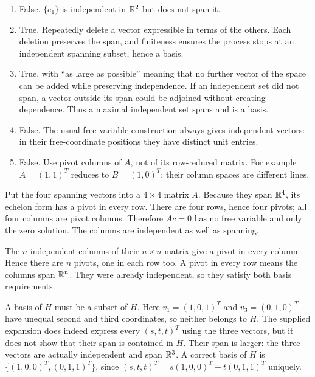 \begin{enumerate}[label=(\alph*)]
\item False. $\{e_1\}$ is independent in $\mathbb{R}^2$ but does not span it.
\item True. Repeatedly delete a vector expressible in terms of the
others. Each deletion preserves the span, and finiteness ensures the
process stops at an independent spanning subset, hence a basis.
\item True, with ``as large as possible'' meaning that no further vector
of the space can be added while preserving independence. If an independent
set did not span, a vector outside its span could be adjoined without
creating dependence. Thus a maximal independent set spans and is a basis.
\item False. The usual free-variable construction always gives independent
vectors: in their free-coordinate positions they have distinct unit entries.
\item False. Use pivot columns of $A$, not of its row-reduced matrix.
For example $A=(1,1)^T$ reduces to $B=(1,0)^T$; their column spaces
are different lines.
\end{enumerate}

Put the four spanning vectors into a $4\times4$ matrix $A$.
Because they span $\mathbb{R}^4$, its echelon form has a pivot in every row.
There are four rows, hence four pivots; all four columns are pivot
columns. Therefore $Ac=0$ has no free variable and only the zero
solution. The columns are independent as well as spanning.

The $n$ independent columns of their $n\times n$ matrix give a pivot
in every column. Hence there are $n$ pivots, one in each row too.
A pivot in every row means the columns span $\mathbb{R}^n$. They were already
independent, so they satisfy both basis requirements.

A basis of $H$ must be a subset of $H$. Here $v_1=(1,0,1)^T$
and $v_3=(0,1,0)^T$ have unequal second and third coordinates,
so neither belongs to $H$. The supplied expansion does indeed express
every $(s,t,t)^T$ using the three vectors, but it does not show that
their span is contained in $H$. Their span is larger: the three vectors
are actually independent and span $\mathbb{R}^3$.
A correct basis of $H$ is $\{(1,0,0)^T,(0,1,1)^T\}$, since
$(s,t,t)^T=s(1,0,0)^T+t(0,1,1)^T$ uniquely.

